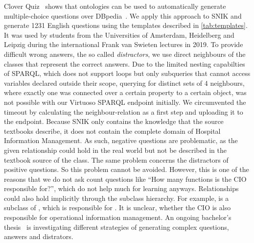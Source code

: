 \documentclass[conference]{IEEEtran}
\newcommand{\citep}{\cite}%
\begin{document}
Clover Quiz~\citep{cloverquiz} shows that ontologies can be used to automatically generate multiple-choice questions over DBpedia~\citep{dbpedia}.
We apply this approach to SNIK and generate 1231 English questions using the templates described in \cref{tab:templates}.
It was used by students from the Universities of Amsterdam, Heidelberg and Leipzig during the international Frank van Swieten lectures in 2019.
To provide difficult wrong answers, the so called \emph{distractors}, we use direct neighbours of the classes that represent the correct answers.
Due to the limited nesting capabilties of SPARQL, which does not support loops but only subqueries that cannot access variables declared outside their scope, querying for distinct sets of 4 neighbours, where exactly one was connected over a certain property to a certain object, was not possible with our Virtuoso SPARQL endpoint initially.
We circumvented the timeout by calculating the neighbour-relation as a first step and uploading it to the endpoint.
%
Because SNIK only contains the knowledge that the source textbooks describe, it does not contain the complete domain of Hospital Information Management.
As such, negative questions are problematic, as the given relationship could hold in the real world but not be described in the textbook source of the class.
The same problem concerns the distractors of positive questions.
So this problem cannot be avoided.
However, this is one of the reasons that we do not ask count questions like \enquote{How many functions is the CIO responsible for?}, which do not help much for learning anyways. %
Relationships could also hold implicitly through the subclass hierarchy.
For example,  is a subclass of , which is responsible for .
It is unclear, whether the CIO is also responsible for operational information management.
An ongoing bachelor's thesis~\citep{snikquiz} is investigating different strategies of generating complex questions, answers and distrators.





\iffalse
\end{document}

